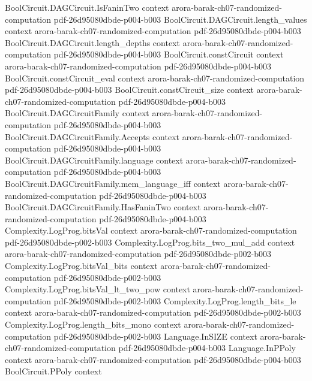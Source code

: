 \begin{theorem}
\proofstep
  {BoolCircuit.DAGCircuit.IsFaninTwo}
  {context}
  {arora-barak-ch07-randomized-computation}
  {pdf-26d95080dbde-p004-b003}
\proofstep
  {BoolCircuit.DAGCircuit.length_values}
  {context}
  {arora-barak-ch07-randomized-computation}
  {pdf-26d95080dbde-p004-b003}
\proofstep
  {BoolCircuit.DAGCircuit.length_depths}
  {context}
  {arora-barak-ch07-randomized-computation}
  {pdf-26d95080dbde-p004-b003}
\proofstep
  {BoolCircuit.constCircuit}
  {context}
  {arora-barak-ch07-randomized-computation}
  {pdf-26d95080dbde-p004-b003}
\proofstep
  {BoolCircuit.constCircuit_eval}
  {context}
  {arora-barak-ch07-randomized-computation}
  {pdf-26d95080dbde-p004-b003}
\proofstep
  {BoolCircuit.constCircuit_size}
  {context}
  {arora-barak-ch07-randomized-computation}
  {pdf-26d95080dbde-p004-b003}
\proofstep
  {BoolCircuit.DAGCircuitFamily}
  {context}
  {arora-barak-ch07-randomized-computation}
  {pdf-26d95080dbde-p004-b003}
\proofstep
  {BoolCircuit.DAGCircuitFamily.Accepts}
  {context}
  {arora-barak-ch07-randomized-computation}
  {pdf-26d95080dbde-p004-b003}
\proofstep
  {BoolCircuit.DAGCircuitFamily.language}
  {context}
  {arora-barak-ch07-randomized-computation}
  {pdf-26d95080dbde-p004-b003}
\proofstep
  {BoolCircuit.DAGCircuitFamily.mem_language_iff}
  {context}
  {arora-barak-ch07-randomized-computation}
  {pdf-26d95080dbde-p004-b003}
\proofstep
  {BoolCircuit.DAGCircuitFamily.HasFaninTwo}
  {context}
  {arora-barak-ch07-randomized-computation}
  {pdf-26d95080dbde-p004-b003}
\proofstep
  {Complexity.LogProg.bitsVal}
  {context}
  {arora-barak-ch07-randomized-computation}
  {pdf-26d95080dbde-p002-b003}
\proofstep
  {Complexity.LogProg.bits_two_mul_add}
  {context}
  {arora-barak-ch07-randomized-computation}
  {pdf-26d95080dbde-p002-b003}
\proofstep
  {Complexity.LogProg.bitsVal_bits}
  {context}
  {arora-barak-ch07-randomized-computation}
  {pdf-26d95080dbde-p002-b003}
\proofstep
  {Complexity.LogProg.bitsVal_lt_two_pow}
  {context}
  {arora-barak-ch07-randomized-computation}
  {pdf-26d95080dbde-p002-b003}
\proofstep
  {Complexity.LogProg.length_bits_le}
  {context}
  {arora-barak-ch07-randomized-computation}
  {pdf-26d95080dbde-p002-b003}
\proofstep
  {Complexity.LogProg.length_bits_mono}
  {context}
  {arora-barak-ch07-randomized-computation}
  {pdf-26d95080dbde-p002-b003}
\proofstep
  {Language.InSIZE}
  {context}
  {arora-barak-ch07-randomized-computation}
  {pdf-26d95080dbde-p004-b003}
\proofstep
  {Language.InPPoly}
  {context}
  {arora-barak-ch07-randomized-computation}
  {pdf-26d95080dbde-p004-b003}
\proofstep
  {BoolCircuit.PPoly}
  {context}

\end{theorem}

